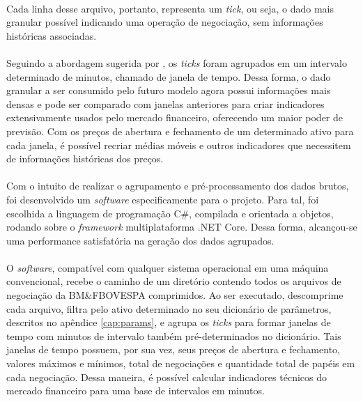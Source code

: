 \documentclass[grad,numbers]{coppe}
\begin{document}
      \paragraph{}Cada linha desse arquivo, portanto, representa um \textit{tick}, ou seja, o dado mais granular possível indicando uma operação de negociação, sem informações históricas associadas.
      
      \paragraph{}Seguindo a abordagem sugerida por \citet{putra-hft}, os \textit{ticks} foram agrupados em um intervalo determinado de minutos, chamado de janela de tempo. Dessa forma, o dado granular a ser consumido pelo futuro modelo agora possui informações mais densas e pode ser comparado com janelas anteriores para criar indicadores extensivamente usados pelo mercado financeiro, oferecendo um maior poder de previsão. Com os preços de abertura e fechamento de um determinado ativo para cada janela, é possível recriar médias móveis e outros indicadores que necessitem de informações históricas dos preços.
      
      \paragraph{}Com o intuito de realizar o agrupamento e pré-processamento dos dados brutos, foi desenvolvido um \textit{software} especificamente para o projeto. Para tal, foi escolhida a linguagem de programação C\#, compilada e orientada a objetos, rodando sobre o \textit{framework} multiplataforma .NET Core. Dessa forma, alcançou-se uma performance satisfatória na geração dos dados agrupados.
      
      \paragraph{}O \textit{software}, compatível com qualquer sistema operacional em uma máquina convencional, recebe o caminho de um diretório contendo todos os arquivos de negociação da BM\&FBOVESPA comprimidos. Ao ser executado, descomprime cada arquivo, filtra pelo ativo determinado no seu dicionário de parâmetros, descritos no apêndice \ref{cap:params}, e agrupa os \textit{ticks} para formar janelas de tempo com minutos de intervalo também pré-determinados no dicionário. Tais janelas de tempo possuem, por sua vez, seus preços de abertura e fechamento, valores máximos e mínimos, total de negociações e quantidade total de papéis em cada negociação. Dessa maneira, é possível calcular indicadores técnicos do mercado financeiro para uma base de intervalos em minutos.
      
\end{document}
